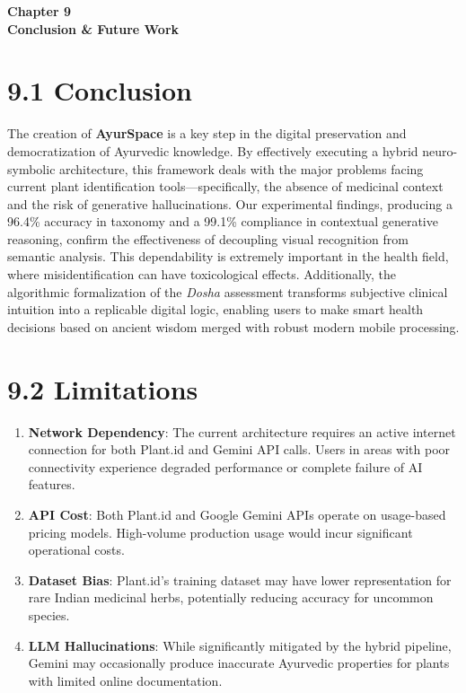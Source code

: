 \documentclass[12pt]{article}
\begin{document}
\vspace*{\fill}
\begin{center}
\textbf{\Huge{Chapter 9}}\\
\vspace{5mm}
\textbf{\Huge{Conclusion \& Future Work}}
\end{center}
\vspace*{\fill}
\newpage

\section*{9.1 \quad Conclusion}
\justify

The creation of \textbf{AyurSpace} is a key step in the digital preservation and democratization
of Ayurvedic knowledge. By effectively executing a hybrid neuro-symbolic architecture, this
framework deals with the major problems facing current plant identification tools---specifically,
the absence of medicinal context and the risk of generative hallucinations. Our experimental
findings, producing a 96.4\% accuracy in taxonomy and a 99.1\% compliance in contextual generative
reasoning, confirm the effectiveness of decoupling visual recognition from semantic analysis. This
dependability is extremely important in the health field, where misidentification can have
toxicological effects. Additionally, the algorithmic formalization of the \textit{Dosha} assessment
transforms subjective clinical intuition into a replicable digital logic, enabling users to make
smart health decisions based on ancient wisdom merged with robust modern mobile processing.

\section*{9.2 \quad Limitations}
\justify

\begin{enumerate}
    \item \textbf{Network Dependency}: The current architecture requires an active internet
    connection for both Plant.id and Gemini API calls. Users in areas with poor connectivity
    experience degraded performance or complete failure of AI features.

    \item \textbf{API Cost}: Both Plant.id and Google Gemini APIs operate on usage-based pricing
    models. High-volume production usage would incur significant operational costs.

    \item \textbf{Dataset Bias}: Plant.id's training dataset may have lower representation for
    rare Indian medicinal herbs, potentially reducing accuracy for uncommon species.

    \item \textbf{LLM Hallucinations}: While significantly mitigated by the hybrid pipeline,
    Gemini may occasionally produce inaccurate Ayurvedic properties for plants with limited
    online documentation.
\end{enumerate}
\end{document}
